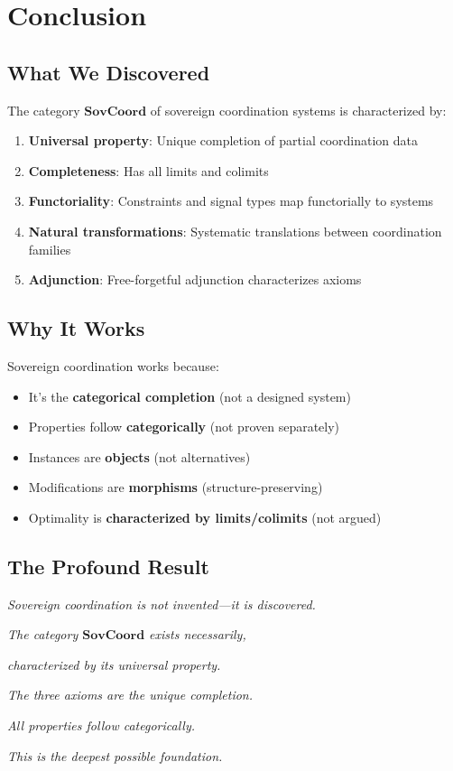 \documentclass[11pt,a4paper]{article}
\theoremstyle{definition}
\theoremstyle{remark}
\newcommand{\SovCoord}{\mathbf{SovCoord}}
\begin{document}
\section{Conclusion}

\subsection{What We Discovered}

The category $\SovCoord$ of sovereign coordination systems is characterized by:
\begin{enumerate}
\item \textbf{Universal property}: Unique completion of partial coordination data
\item \textbf{Completeness}: Has all limits and colimits
\item \textbf{Functoriality}: Constraints and signal types map functorially to systems
\item \textbf{Natural transformations}: Systematic translations between coordination families
\item \textbf{Adjunction}: Free-forgetful adjunction characterizes axioms
\end{enumerate}

\subsection{Why It Works}

Sovereign coordination works because:
\begin{itemize}
\item It's the \textbf{categorical completion} (not a designed system)
\item Properties follow \textbf{categorically} (not proven separately)
\item Instances are \textbf{objects} (not alternatives)
\item Modifications are \textbf{morphisms} (structure-preserving)
\item Optimality is \textbf{characterized by limits/colimits} (not argued)
\end{itemize}

\subsection{The Profound Result}

\begin{center}
\Large
\textit{Sovereign coordination is not invented—it is discovered.}

\medskip

\textit{The category $\SovCoord$ exists necessarily,}

\textit{characterized by its universal property.}

\medskip

\textit{The three axioms are the unique completion.}

\textit{All properties follow categorically.}

\medskip

\textit{This is the deepest possible foundation.}
\end{center}
\end{document}
